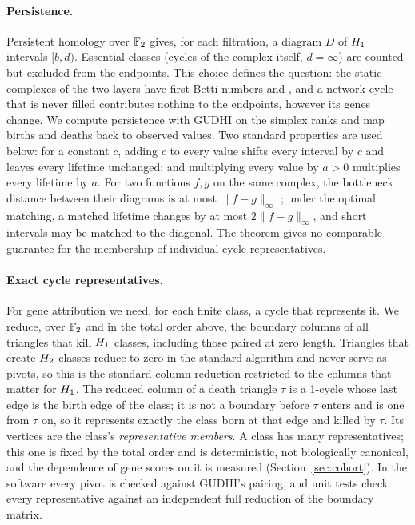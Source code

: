 \paragraph{Persistence.} Persistent homology over $\mathbb{F}_{2}$ \citep{edelsbrunner2002} gives, for each filtration, a diagram $D$ of $H_{1}$ intervals $[b,d)$. Essential classes (cycles of the complex itself, $d=\infty$) are counted but excluded from the endpoints. This choice defines the question: the static complexes of the two layers have first Betti numbers \rnaNetBone{} and \methNetBone{}, and a network cycle that is never filled contributes nothing to the endpoints, however its genes change. We compute persistence with GUDHI \citep{maria2014} on the simplex ranks and map births and deaths back to observed values. Two standard properties are used below: for a constant $c$, adding $c$ to every value shifts every interval by $c$ and leaves every lifetime unchanged; and multiplying every value by $a>0$ multiplies every lifetime by $a$. For two functions $f,g$ on the same complex, the bottleneck distance between their diagrams is at most $\lVert f-g\rVert_\infty$ \citep{cohensteiner2007}; under the optimal matching, a matched lifetime changes by at most $2\lVert f-g\rVert_\infty$, and short intervals may be matched to the diagonal. The theorem gives no comparable guarantee for the membership of individual cycle representatives.

\paragraph{Exact cycle representatives.} For gene attribution we need, for each finite class, a cycle that represents it. We reduce, over $\mathbb{F}_{2}$ and in the total order above, the boundary columns of all triangles that kill $H_{1}$ classes, including those paired at zero length. Triangles that create $H_{2}$ classes reduce to zero in the standard algorithm and never serve as pivots, so this is the standard column reduction restricted to the columns that matter for $H_{1}$. The reduced column of a death triangle $\tau$ is a 1-cycle whose last edge is the birth edge of the class; it is not a boundary before $\tau$ enters and is one from $\tau$ on, so it represents exactly the class born at that edge and killed by $\tau$. Its vertices are the class's \emph{representative members}. A class has many representatives; this one is fixed by the total order and is deterministic, not biologically canonical, and the dependence of gene scores on it is measured (Section~\ref{sec:cohort}). In the software every pivot is checked against GUDHI's pairing, and unit tests check every representative against an independent full reduction of the boundary matrix.

